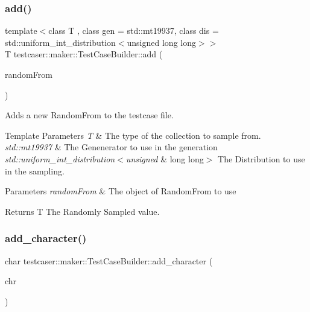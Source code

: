 \subsubsection{\texorpdfstring{add()}{add()}\hspace{0.1cm}{\footnotesize\ttfamily [11/11]}}
{\footnotesize\ttfamily template$<$class T , class gen  = std\+::mt19937, class dis  = std\+::uniform\+\_\+int\+\_\+distribution$<$unsigned long long$>$$>$ \\
T testcaser\+::maker\+::\+Test\+Case\+Builder\+::add (\begin{DoxyParamCaption}\item[{\mbox{\hyperlink{structtestcaser_1_1maker_1_1types_1_1RandomFrom}{types\+::\+Random\+From}}$<$ T, gen, dis $>$ \&}]{random\+From }\end{DoxyParamCaption})\hspace{0.3cm}{\ttfamily [inline]}}



Adds a new Random\+From to the testcase file. 


\begin{DoxyTemplParams}{Template Parameters}
{\em T} & The type of the collection to sample from. \\
\hline
{\em std\+::mt19937} & The Genenerator to use in the generation \\
\hline
{\em std\+::uniform\+\_\+int\+\_\+distribution$<$unsigned} & long long$>$ The Distribution to use in the sampling. \\
\hline
\end{DoxyTemplParams}

\begin{DoxyParams}{Parameters}
{\em random\+From} & The object of Random\+From to use \\
\hline
\end{DoxyParams}
\begin{DoxyReturn}{Returns}
T The Randomly Sampled value. 
\end{DoxyReturn}
\mbox{\label{classtestcaser_1_1maker_1_1TestCaseBuilder_a41885a504a99f9c450e793e183898488}} 
\subsubsection{\texorpdfstring{add\_character()}{add\_character()}}
{\footnotesize\ttfamily char testcaser\+::maker\+::\+Test\+Case\+Builder\+::add\+\_\+character (\begin{DoxyParamCaption}\item[{char}]{chr }\end{DoxyParamCaption})\hspace{0.3cm}{\ttfamily [inline]}}



